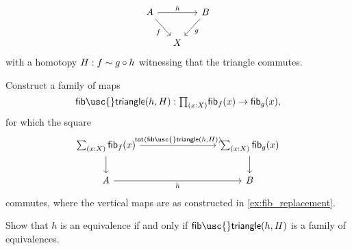 \begin{exercises}
\begin{equation*}
\begin{tikzcd}[column sep=small]
A \arrow[rr,"h"] \arrow[dr,swap,"f"] & & B \arrow[dl,"g"] \\
& X
\end{tikzcd}
\end{equation*}
with a homotopy $H:f\sim g\circ h$ witnessing that the triangle commutes. 
\begin{subexenum}
\item Construct a family of maps
\begin{equation*}
\mathsf{fib\usc{}triangle}(h,H):\prd{x:X}\fib{f}{x}\to\fib{g}{x},
\end{equation*}
for which the square
\begin{equation*}
\begin{tikzcd}[column sep=8em]
\sm{x:X}\fib{f}{x} \arrow[r,"\total{\mathsf{fib\usc{}triangle}(h,H)}"] \arrow[d] & \sm{x:X}\fib{g}{x} \arrow[d] \\
A \arrow[r,swap,"h"] & B
\end{tikzcd}
\end{equation*}
commutes, where the vertical maps are as constructed in \cref{ex:fib_replacement}.
\item Show that $h$ is an equivalence if and only if $\mathsf{fib\usc{}triangle}(h,H)$ is a family of equivalences.
\end{subexenum}
\begin{comment}
\item Let $f:A\to B$ be a map, and let $s,t : \fib{f}{b}$. Consider the function
\begin{equation*}
\varphi : (s=t)\to \fib{\apfunc{f}}{\ct{\proj 2(s)}{\proj 2(t)^{-1}}}
\end{equation*}
given by $\varphi(\refl{s})=(\refl{\proj 1(s)},\mathsf{right\usc{}inv}(\proj 2(s))^{-1})$. Show that this map is an equivalence. Conclude that for any $q:f(x)=f(y)$ we have an equivalence
\begin{equation*}
((x,q)=(y,\refl{f(y)})) \simeq \fib{\apfunc{f}}{q}.
\end{equation*}
\item Construct an equivalence 
\begin{equation*}
\eqv{\big(\sm{x:A}f(x)=y\big)}{\big(\sm{x:A}y=f(x)\big)}.
\end{equation*}
\end{comment}
\end{exercises}
